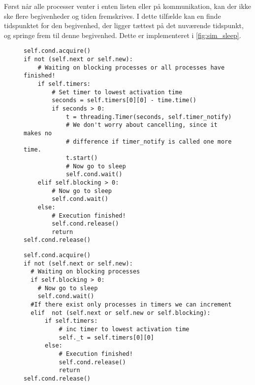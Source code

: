 Først når alle processer venter i enten  listen eller på kommunikation, kan der ikke ske flere begivenheder og tiden fremskrives. 
I dette tilfælde  kan \sched en finde tidspunktet for den begivenhed, der ligger tættest på det nuværende tidspunkt,  og springe frem til denne begivenhed. Dette er implementeret i \cref{fig:sim_sleep}.
\begin{figure}[hbtp]
\begin{minipage}[c]{\linewidth}
\begin{lstlisting}[firstnumber=239, label=fig:blocking_sleep, caption=Uddrag af \sched en i \code{Scheduler}]
self.cond.acquire()
if not (self.next or self.new):
    # Waiting on blocking processes or all processes have finished!
    if self.timers:
        # Set timer to lowest activation time
        seconds = self.timers[0][0] - time.time()
        if seconds > 0:
            t = threading.Timer(seconds, self.timer_notify)
            # We don't worry about cancelling, since it makes no 
            # difference if timer_notify is called one more time.
            t.start()
            # Now go to sleep
            self.cond.wait()
    elif self.blocking > 0:
        # Now go to sleep
        self.cond.wait()
    else:
        # Execution finished!
        self.cond.release()
        return
self.cond.release()
\end{lstlisting}
\end{minipage}
\begin{minipage}[c]{\linewidth}
\begin{lstlisting}[firstnumber=158, label=fig:sim_sleep, caption= Uddrag af \sched en i Simulation-versionen]
self.cond.acquire()
if not (self.next or self.new):
  # Waiting on blocking processes
  if self.blocking > 0:
    # Now go to sleep
    self.cond.wait()
  #If there exist only processes in timers we can increment
  elif  not (self.next or self.new or self.blocking): 
      if self.timers:
          # inc timer to lowest activation time
          self._t = self.timers[0][0]
      else:
          # Execution finished!
          self.cond.release()
          return
self.cond.release()  
\end{lstlisting}
\end{minipage}
\end{figure}


